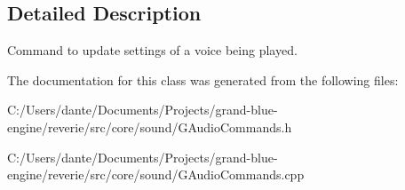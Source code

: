 \subsection{Detailed Description}
Command to update settings of a voice being played. 

The documentation for this class was generated from the following files\+:\begin{DoxyCompactItemize}
\item 
C\+:/\+Users/dante/\+Documents/\+Projects/grand-\/blue-\/engine/reverie/src/core/sound/G\+Audio\+Commands.\+h\item 
C\+:/\+Users/dante/\+Documents/\+Projects/grand-\/blue-\/engine/reverie/src/core/sound/G\+Audio\+Commands.\+cpp\end{DoxyCompactItemize}
